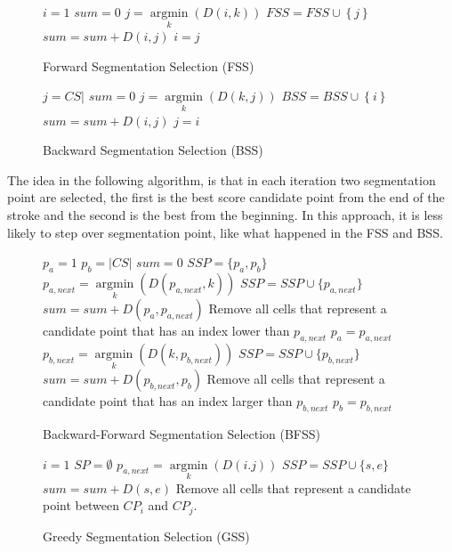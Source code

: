 \documentclass[12pt,journal,compsoc]{IEEEtran}
\begin{document}
\begin{figure}
\begin{algorithmic}
\STATE $i=1$
\STATE $sum=0$
\STATE $j = \mathop {\arg \min }\limits_k \left( {D\left( {i,k} \right)} \right)$
\STATE $FSS = FSS \cup \left\{ j \right\}$
\STATE $sum = sum + D\left( {i,j} \right)$
\STATE $i=j$
\ENDWHILE
\end{algorithmic}
\caption{Forward Segmentation Selection (FSS)}
\label{alg:fss}
\end{figure}

\begin{figure}
\begin{algorithmic}
\STATE $j={CS|}$
\STATE $sum=0$
\STATE $j = \mathop {\arg \min }\limits_k \left( {D\left( {k,j} \right)} \right)$
\STATE $BSS = BSS \cup \left\{ i \right\}$
\STATE $sum = sum + D\left( {i,j} \right)$
\STATE $j=i$
\ENDWHILE
\end{algorithmic}
\caption{Backward Segmentation Selection (BSS)}
\label{alg:bss}
\end{figure}

The idea in the following algorithm, is that in each iteration two segmentation point are selected, the first is the best score candidate point from the end of the stroke and the second is the best from the beginning. In this approach, it is less likely to step over segmentation point, like what happened in the FSS and BSS.

\begin{figure}
\begin{algorithmic}
\STATE $p_{a}=1$
\STATE $p_{b}=|CS|$
\STATE $sum=0$
\STATE $SSP=\{p_{a},p_{b}\}$
\STATE $p_{a,next} = \mathop {\arg \min}\limits_k (D(p_{a,next},k))$
\STATE $SSP = SSP \cup \{p_{a,next}\}$
\STATE $sum = sum + D(p_a,p_{a,next})$
\STATE Remove all cells that represent a candidate point that has an index lower than $p_{a,next}$
\STATE $p_{a}=p_{a,next}$
\STATE $p_{b,next} = \mathop {\arg \min}\limits_k (D(k,p_{b,next}))$
\STATE $SSP = SSP \cup \{p_{b,next}\}$
\STATE $sum = sum + D(p_{b,next},p_b)$
\STATE Remove all cells that represent a candidate point that has an index larger than  $p_{b,next}$
\STATE $p_{b}=p_{b,next}$
\ENDWHILE
\end{algorithmic}
\caption{Backward-Forward Segmentation Selection (BFSS)}
\label{alg:bfss}
\end{figure}

\begin{figure}
\begin{algorithmic}
\STATE $i={1}$
\STATE $SP=\emptyset$
\STATE $p_{a,next} = \mathop {\arg \min}\limits_k (D(i.j))$
\STATE $SSP = SSP \cup \{s,e\}$
\STATE $sum = sum + D(s,e)$
\STATE	Remove all cells that represent a candidate point between $CP_{i}$ and $CP_{j}$.
\ENDWHILE
\end{algorithmic}
\caption{Greedy Segmentation Selection (GSS)}
\label{alg:gss}
\end{figure}
\end{document}
